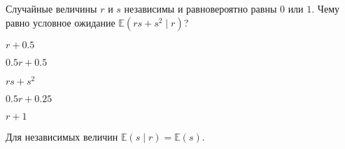 
\begin{question}
Случайные величины \(r\) и \(s\) независимы и равновероятно равны \(0\) или \(1\).
Чему равно условное ожидание \(\mathbb E(rs + s^2 \mid r)\)?
\begin{answerlist}
  \item \(r + 0.5\)
  \item \(0.5r + 0.5\)
  \item \(rs + s^2\)
  \item \(0.5r + 0.25\)
  \item \(r + 1\)
\end{answerlist}
\end{question}

\begin{solution}
Для независимых величин \(\mathbb E(s \mid r) = \mathbb E(s)\).
\end{solution}

